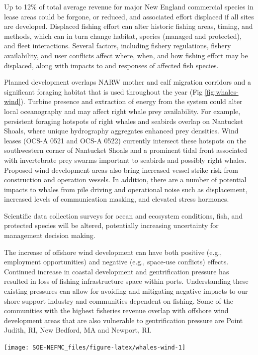 \documentclass[
  10pt,
]{article}
\let\origfigure\figure
\let\endorigfigure\endfigure
\renewenvironment{figure}[1][2] {
    \expandafter\origfigure\expandafter[H]
} {
    \endorigfigure
}
\begin{document}
Up to 12\% of total average revenue for major New England commercial species in lease areas could be forgone, or reduced, and associated effort displaced if all sites are developed. Displaced fishing effort can alter historic fishing areas, timing, and methods, which can in turn change habitat, species (managed and protected), and fleet interactions. Several factors, including fishery regulations, fishery availability, and user conflicts affect where, when, and how fishing effort may be displaced, along with impacts to and responses of affected fish species.

Planned development overlaps NARW mother and calf migration corridors and a significant foraging habitat that is used throughout the year (Fig \ref{fig:whales-wind}). Turbine presence and extraction of energy from the system could alter local oceanography and may affect right whale prey availability. For example, persistent foraging hotspots of right whales and seabirds overlap on Nantucket Shoals, where unique hydrography aggregates enhanced prey densities. Wind leases (OCS-A 0521 and OCS-A 0522) currently intersect these hotspots on the southwestern corner of Nantucket Shoals and a prominent tidal front associated with invertebrate prey swarms important to seabirds and possibly right whales. Proposed wind development areas also bring increased vessel strike risk from construction and operation vessels. In addition, there are a number of potential impacts to whales from pile driving and operational noise such as displacement, increased levels of communication masking, and elevated stress hormones.

Scientific data collection surveys for ocean and ecosystem conditions, fish, and protected species will be altered, potentially increasing uncertainty for management decision making.

The increase of offshore wind development can have both positive (e.g., employment opportunities) and negative (e.g., space-use conflicts) effects. Continued increase in coastal development and gentrification pressure has resulted in loss of fishing infrastructure space within ports. Understanding these existing pressures can allow for avoiding and mitigating negative impacts to our shore support industry and communities dependent on fishing. Some of the communities with the highest fisheries revenue overlap with offshore wind development areas that are also vulnerable to gentrification pressure are Point Judith, RI, New Bedford, MA and Newport, RI.

\begin{figure}

{\centering \texttt{[image: SOE-NEFMC\_files/figure-latex/whales-wind-1]} 

}

\caption{Northern Right Whale persistent hotspots and Wind Energy Areas.}\label{fig:whales-wind}
\end{figure}
\end{document}
